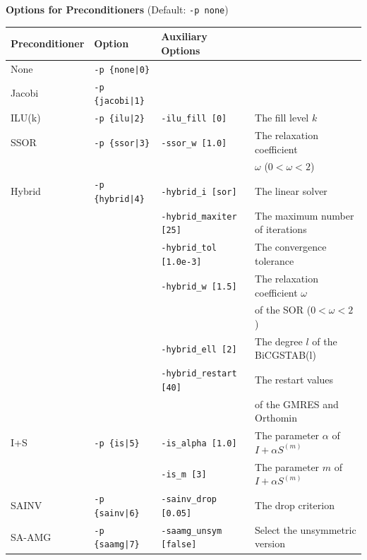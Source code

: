 \documentclass[a4paper]{article}
\begin{document}
\begin{minipage}[t]{\textwidth}
\begin{center}
{\bf Options for Preconditioners} (Default: \verb=-p none=)\\
\begin{tabular}{l|lll}\hline\hline
Preconditioner   & Option           & Auxiliary Options \\ \hline
None     & \verb=-p {none|0}=    &   \\
Jacobi   & \verb=-p {jacobi|1}=  &     \\
ILU(k)   & \verb=-p {ilu|2}=     & \verb=-ilu_fill [0]=    & The fill level $k$ \\
SSOR     & \verb=-p {ssor|3}=    & \verb=-ssor_w [1.0]=    & The relaxation coefficient \\
         &                       &                         & $\omega$ ($0<\omega<2$) \\
Hybrid   & \verb=-p {hybrid|4}=  & \verb=-hybrid_i [sor]=  & The linear solver\\
         &                       & \verb=-hybrid_maxiter [25]= & The
 maximum number of iterations \\
         &                       & \verb=-hybrid_tol [1.0e-3]= & The convergence tolerance \\
         &                       & \verb=-hybrid_w [1.5]=      & The
 relaxation coefficient $\omega$ \\
         &                       &                             & of the SOR ($0<\omega<2$) \\
         &                       & \verb=-hybrid_ell [2]=      & The
 degree $l$ of the BiCGSTAB(l) \\
         &                       & \verb=-hybrid_restart [40]= & The
 restart values \\
         &                       &                             & of the GMRES and Orthomin \\
I+S      & \verb=-p {is|5}=      & \verb=-is_alpha [1.0]=  &  The
 parameter $\alpha$ of $I+\alpha S^{(m)}$ \\
         &                       & \verb=-is_m [3]=        & The
 parameter $m$ of $I+\alpha S^{(m)}$ \\
SAINV    & \verb=-p {sainv|6}=   & \verb=-sainv_drop [0.05]=    & The drop criterion\\
SA-AMG   & \verb=-p {saamg|7}=   & \verb=-saamg_unsym [false]=    &
 Select the unsymmetric version    \\

\end{tabular}
\end{center}
\end{minipage}
\end{document}
